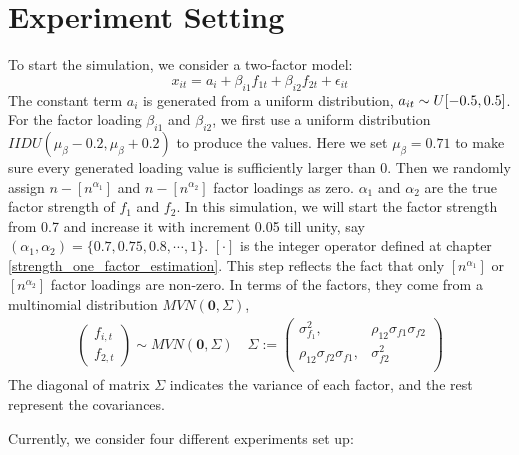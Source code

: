 	\section{Experiment Setting}\label{exp_set}
To start the simulation, we consider a two-factor model:
\[    x_{it} = a_{i} + \beta_{i1}f_{1t} + \beta_{i2}f_{2t}+\epsilon_{it} \tag{8} \label{two_factor}   \]
The constant term $a_{i}$ is generated from a uniform distribution, $a_{it} \sim \mathnormal{U}[-0.5,0.5]$.
For the factor loading $\beta_{i1}$ and $\beta_{i2}$, we first use a uniform distribution $IIDU(\mu_{\beta} - 0.2, \mu_{\beta}+0.2)$ to produce the values.
Here we set $\mu_{\beta}=0.71$ to make sure every generated loading value is sufficiently larger than 0.
Then we randomly assign $n - [n^{\alpha_{1}}]$ and $n - [n^{\alpha_{2}}]$ factor loadings as zero.
$\alpha_1$ and $\alpha_2$ are the true factor strength of $f_1$ and $f_2$. 
In this simulation, we will start the factor strength from 0.7 and increase it with increment 0.05 till unity, say $(\alpha_{1}, \alpha_{2}) = \{0.7, 0.75,0.8,\cdots,1\}$.
 $[\cdot]$ is the integer operator defined at chapter \ref{strength_one_factor_estimation}.
This step reflects the fact that only $[n^{\alpha_1}]$ or $[n^{\alpha_2}]$ factor loadings are non-zero.
In terms of the factors, they come from a multinomial distribution $MVN(\bm{0}, \Sigma) $, 
\begin{align*}
 \begin{pmatrix}
		f_{i,t}\\f_{2,t}
	\end{pmatrix} \sim MVN(\bm{0}, \Sigma) \quad
	\Sigma := 
	\begin{pmatrix}
		\sigma^2_{f_1}, & \rho_{12}\sigma_{f1}\sigma_{f2} \\
		\rho_{12}\sigma_{f2}\sigma_{f1}, & \sigma^2_{f2} \\
	\end{pmatrix}
\end{align*}
The diagonal of matrix $\Sigma$ indicates the variance of each factor, and the rest represent the covariances.

Currently, we consider four different experiments set up:

